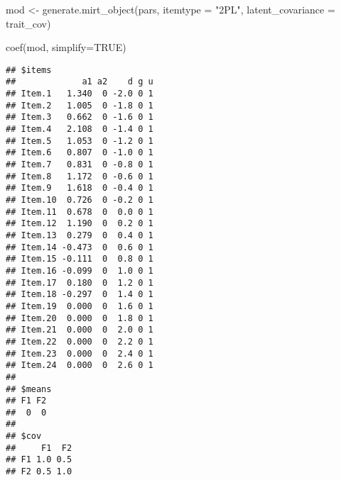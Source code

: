\documentclass[
]{article}
\newenvironment{Shaded}{\begin{snugshade}}{\end{snugshade}}
\newcommand{\AttributeTok}[1]{\textcolor[rgb]{0.77,0.63,0.00}{#1}}
\newcommand{\ConstantTok}[1]{\textcolor[rgb]{0.00,0.00,0.00}{#1}}
\newcommand{\FunctionTok}[1]{\textcolor[rgb]{0.00,0.00,0.00}{#1}}
\newcommand{\NormalTok}[1]{#1}
\newcommand{\OtherTok}[1]{\textcolor[rgb]{0.56,0.35,0.01}{#1}}
\newcommand{\StringTok}[1]{\textcolor[rgb]{0.31,0.60,0.02}{#1}}
\begin{document}
\begin{Shaded}
\begin{Highlighting}[]
\NormalTok{mod }\OtherTok{\textless{}{-}} \FunctionTok{generate.mirt\_object}\NormalTok{(pars, }\AttributeTok{itemtype =} \StringTok{"2PL"}\NormalTok{, }\AttributeTok{latent\_covariance =}\NormalTok{ trait\_cov)}

\FunctionTok{coef}\NormalTok{(mod, }\AttributeTok{simplify=}\ConstantTok{TRUE}\NormalTok{)}
\end{Highlighting}
\end{Shaded}

\begin{verbatim}
## $items
##             a1 a2    d g u
## Item.1   1.340  0 -2.0 0 1
## Item.2   1.005  0 -1.8 0 1
## Item.3   0.662  0 -1.6 0 1
## Item.4   2.108  0 -1.4 0 1
## Item.5   1.053  0 -1.2 0 1
## Item.6   0.807  0 -1.0 0 1
## Item.7   0.831  0 -0.8 0 1
## Item.8   1.172  0 -0.6 0 1
## Item.9   1.618  0 -0.4 0 1
## Item.10  0.726  0 -0.2 0 1
## Item.11  0.678  0  0.0 0 1
## Item.12  1.190  0  0.2 0 1
## Item.13  0.279  0  0.4 0 1
## Item.14 -0.473  0  0.6 0 1
## Item.15 -0.111  0  0.8 0 1
## Item.16 -0.099  0  1.0 0 1
## Item.17  0.180  0  1.2 0 1
## Item.18 -0.297  0  1.4 0 1
## Item.19  0.000  0  1.6 0 1
## Item.20  0.000  0  1.8 0 1
## Item.21  0.000  0  2.0 0 1
## Item.22  0.000  0  2.2 0 1
## Item.23  0.000  0  2.4 0 1
## Item.24  0.000  0  2.6 0 1
## 
## $means
## F1 F2 
##  0  0 
## 
## $cov
##     F1  F2
## F1 1.0 0.5
## F2 0.5 1.0
\end{verbatim}
\end{document}
